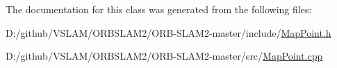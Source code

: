 The documentation for this class was generated from the following files\+:\begin{DoxyCompactItemize}
\item 
D\+:/github/\+V\+S\+L\+A\+M/\+O\+R\+B\+S\+L\+A\+M2/\+O\+R\+B-\/\+S\+L\+A\+M2-\/master/include/\mbox{\hyperlink{_map_point_8h}{Map\+Point.\+h}}\item 
D\+:/github/\+V\+S\+L\+A\+M/\+O\+R\+B\+S\+L\+A\+M2/\+O\+R\+B-\/\+S\+L\+A\+M2-\/master/src/\mbox{\hyperlink{_map_point_8cpp}{Map\+Point.\+cpp}}\end{DoxyCompactItemize}
